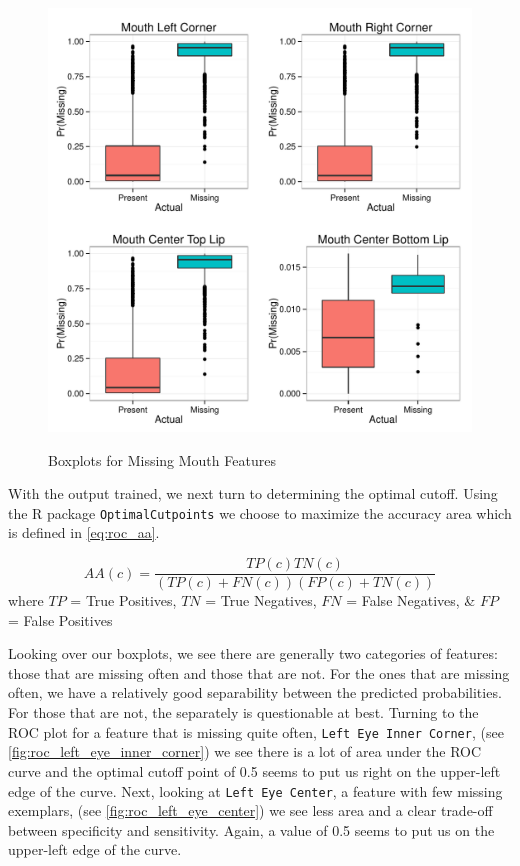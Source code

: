 \documentclass[conference]{IEEEtran}
\begin{document}
\begin{figure}[!ht]
  \centering
  \caption{Boxplots for Missing Mouth Features}
  \includegraphics[scale=.5]{logistic_boxplots_mouth.pdf}
  \label{fig:logistic_boxplots_mouth}
\end{figure}


With the output trained, we next turn to determining the optimal cutoff.  Using the R package \texttt{OptimalCutpoints} we choose to maximize the accuracy area \cite{lewis2008use,greiner1995two,greiner1996two} which is defined in \cref{eq:roc_aa}.

\[\label{eq:roc_aa}
AA(c)=\frac{TP(c)TN(c)}{(TP(c)+FN(c))(FP(c)+TN(c))}
\]
where $TP$ = True Positives, $TN$ = True Negatives, $FN$ = False Negatives, \& $FP$ = False Positives

Looking over our boxplots, we see there are generally two categories of features: those that are missing often and those that are not.  For the ones that are missing often, we have a relatively good separability between the predicted probabilities.  For those that are not, the separately is questionable at best.  Turning to the ROC plot for a feature that is missing quite often, \texttt{Left Eye Inner Corner}, (see \cref{fig:roc_left_eye_inner_corner}) we see there is a lot of area under the ROC curve and the optimal cutoff point of 0.5 seems to put us right on the upper-left edge of the curve.  Next, looking at \texttt{Left Eye Center}, a feature with few missing exemplars, (see \cref{fig:roc_left_eye_center}) we see less area and a clear trade-off between specificity and sensitivity.  Again, a value of 0.5 seems to put us on the upper-left edge of the curve.
\end{document}
